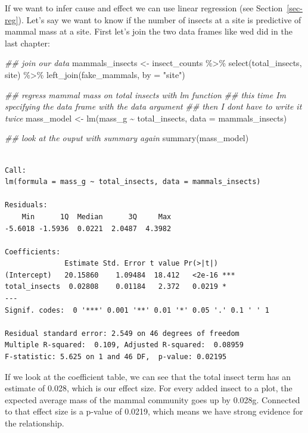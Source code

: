 \documentclass[
  letterpaper,
  DIV=11,
  numbers=noendperiod]{scrreprt}
\newenvironment{Shaded}{\begin{snugshade}}{\end{snugshade}}
\newcommand{\AttributeTok}[1]{\textcolor[rgb]{0.40,0.45,0.13}{#1}}
\newcommand{\DocumentationTok}[1]{\textcolor[rgb]{0.37,0.37,0.37}{\textit{#1}}}
\newcommand{\FunctionTok}[1]{\textcolor[rgb]{0.28,0.35,0.67}{#1}}
\newcommand{\NormalTok}[1]{\textcolor[rgb]{0.00,0.23,0.31}{#1}}
\newcommand{\OtherTok}[1]{\textcolor[rgb]{0.00,0.23,0.31}{#1}}
\newcommand{\SpecialCharTok}[1]{\textcolor[rgb]{0.37,0.37,0.37}{#1}}
\newcommand{\StringTok}[1]{\textcolor[rgb]{0.13,0.47,0.30}{#1}}
\begin{document}
If we want to infer cause and effect we can use linear regression (see
Section~\ref{sec-reg}). Let's say we want to know if the number of
insects at a site is predictive of mammal mass at a site. First let's
join the two data frames like wed did in the last chapter:

\begin{Shaded}
\begin{Highlighting}[]
\DocumentationTok{\#\# join our data}
\NormalTok{mammals\_insects }\OtherTok{\textless{}{-}}\NormalTok{ insect\_counts }\SpecialCharTok{\%\textgreater{}\%}
  \FunctionTok{select}\NormalTok{(total\_insects, site) }\SpecialCharTok{\%\textgreater{}\%}
  \FunctionTok{left\_join}\NormalTok{(fake\_mammals, }\AttributeTok{by =} \StringTok{"site"}\NormalTok{)}

\DocumentationTok{\#\# regress mammal mass on total insects with lm function}
\DocumentationTok{\#\# this time I\textquotesingle{}m specifying the data frame with the data argument}
\DocumentationTok{\#\# then I don\textquotesingle{}t have to write it twice}
\NormalTok{mass\_model }\OtherTok{\textless{}{-}} \FunctionTok{lm}\NormalTok{(mass\_g }\SpecialCharTok{\textasciitilde{}}\NormalTok{ total\_insects, }\AttributeTok{data =}\NormalTok{ mammals\_insects)}

\DocumentationTok{\#\# look at the ouput with summary again}
\FunctionTok{summary}\NormalTok{(mass\_model)}
\end{Highlighting}
\end{Shaded}

\begin{verbatim}

Call:
lm(formula = mass_g ~ total_insects, data = mammals_insects)

Residuals:
    Min      1Q  Median      3Q     Max 
-5.6018 -1.5936  0.0221  2.0487  4.3982 

Coefficients:
              Estimate Std. Error t value Pr(>|t|)    
(Intercept)   20.15860    1.09484  18.412   <2e-16 ***
total_insects  0.02808    0.01184   2.372   0.0219 *  
---
Signif. codes:  0 '***' 0.001 '**' 0.01 '*' 0.05 '.' 0.1 ' ' 1

Residual standard error: 2.549 on 46 degrees of freedom
Multiple R-squared:  0.109, Adjusted R-squared:  0.08959 
F-statistic: 5.625 on 1 and 46 DF,  p-value: 0.02195
\end{verbatim}

If we look at the coefficient table, we can see that the total insect
term has an estimate of 0.028, which is our effect size. For every added
insect to a plot, the expected average mass of the mammal community goes
up by 0.028g. Connected to that effect size is a p-value of 0.0219,
which means we have strong evidence for the relationship.
\end{document}
